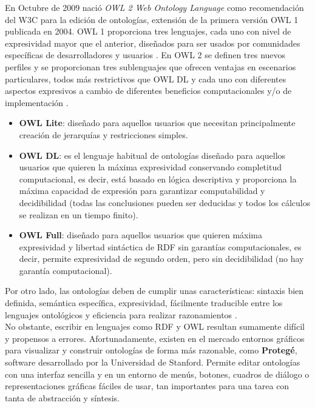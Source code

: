 En Octubre de 2009 nació \textit{OWL 2 Web Ontology Language} como recomendación del W3C para la edición de ontologías, extensión de la primera versión OWL 1 publicada en 2004. OWL 1 proporciona tres lenguajes, cada uno con nivel de expresividad mayor que el anterior, diseñados para ser usados por comunidades específicas de desarrolladores y usuarios \cite{owl-tipos}. En OWL 2 se definen tres nuevos perfiles y se proporcionan tres sublenguajes que ofrecen ventajas en escenarios particulares, todos más restrictivos que OWL DL y cada uno con diferentes aspectos expresivos a cambio de diferentes beneficios computacionales y/o de implementación \cite{aplicacion}. 

\begin{itemize}
	\item \textbf{OWL Lite}: diseñado para aquellos usuarios que necesitan principalmente creación de jerarquías y restricciones simples.
	
	\item \textbf{OWL DL}: es el lenguaje habitual de ontologías diseñado para aquellos usuarios que quieren la máxima expresividad conservando completitud computacional, es decir, está basado en lógica descriptiva y proporciona la máxima capacidad de expresión para garantizar computabilidad y decidibilidad (todas las conclusiones pueden ser deducidas y todos los cálculos se realizan en un tiempo finito).
	
	\item \textbf{OWL Full}: diseñado para aquellos usuarios que quieren máxima expresividad y libertad sintáctica de RDF sin garantías computacionales, es decir, permite expresividad de segundo orden, pero sin decidibilidad (no hay garantía computacional).
\end{itemize}

Por otro lado, las ontologías deben de cumplir unas características: sintaxis bien definida, semántica específica, expresividad, fácilmente traducible entre los lenguajes ontológicos y eficiencia para realizar razonamientos \cite{apuntes-clase-jose}.\\

No obstante, escribir en lenguajes como RDF y OWL resultan sumamente difícil y propensos a errores. Afortunadamente, existen en el mercado entornos gráficos para visualizar y construir ontologías de forma más razonable, como \textbf{Protegé}, software desarrollado por la Universidad de Stanford. Permite editar ontologías con una interfaz sencilla y en un entorno de menús, botones, cuadros de diálogo o representaciones gráficas fáciles de usar, tan importantes para una tarea con tanta de abstracción y síntesis.

